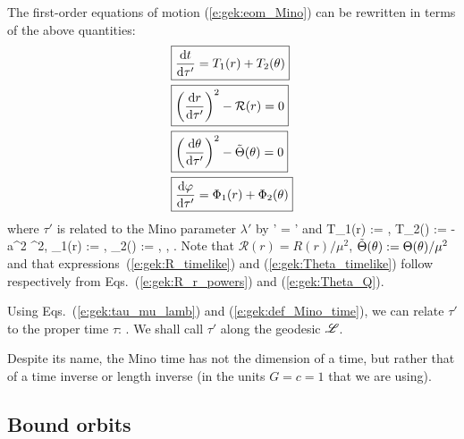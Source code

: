The first-order equations of motion (\ref{e:gek:eom_Mino}) can be rewritten in terms of the above quantities:
\begin{subequations}
\label{e:gek:timelike_system}
\begin{align}
& \fbox{$\displaystyle  \frac{\mathrm{d} t}{\mathrm{d} \tau'} = T_1(r) + T_2(\theta) $} \label{e:gek:dtdmino_timelike}\\
& \fbox{$\displaystyle   \left( \frac{\mathrm{d} r}{\mathrm{d} \tau'} \right)^2 - \mathcal{R}(r) = 0 $} \label{e:gek:r_eff_pot_timelike}\\
& \fbox{$\displaystyle  \left( \frac{\mathrm{d} \theta}{\mathrm{d} \tau'} \right)^2 - \tilde{\Theta}(\theta) = 0 $} \label{e:gek:th_eff_pot_timelike}\\
& \fbox{$\displaystyle  \frac{\mathrm{d} \varphi}{\mathrm{d} \tau'}  = \Phi_1(r) + \Phi_2(\theta) $} \label{e:gek:dphdmino_timelike}
\end{align}
\end{subequations}
where $\tau'$ is related to the Mino parameter $\lambda'$ by
\be
   \tau' = \mu \lambda'
\ee
and
\be
    T_1(r) := ,\qquad
    T_2(\th) := - a^2 \veps \sin^2\th,
\ee
\be
    \Phi_1(r) := ,\qquad
    \Phi_2(\th) := \frac{\ell}{\sin^2\th} ,
\ee
\be \label{e:gek:R_timelike}
  ,
\ee
\be \label{e:gek:Theta_timelike}
   .
\ee
Note that $\mathcal{R}(r) = R(r) / \mu^2$, $\tilde\Theta(\theta) := \Theta(\theta) / \mu^2$
and that expressions~(\ref{e:gek:R_timelike}) and (\ref{e:gek:Theta_timelike})
follow respectively from Eqs.~(\ref{e:gek:R_r_powers}) and (\ref{e:gek:Theta_Q}).

Using Eqs.~(\ref{e:gek:tau_mu_lamb}) and (\ref{e:gek:def_Mino_time}), we can
relate $\tau'$ to the proper time $\tau$:
\be \label{e:gek:Mino_time_tau}
    .
\ee
We shall call $\tau'$ 
along the geodesic $\mathscr{L}$.
\begin{remark}
Despite its name, the Mino time has not the dimension of a time, but rather
that of a time inverse or length inverse (in the units $G=c=1$ that we
are using).
\end{remark}


\subsection{Bound orbits}

